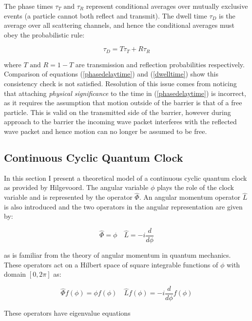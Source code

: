 \documentclass{article}
\begin{document}
\noindent The phase times $\tau_T \text{ and } \tau_R$ represent conditional averages over mutually exclusive events (a particle cannot both reflect and transmit). The dwell time $\tau_D$ is the average over all scattering channels, and hence the conditional averages must obey the probabilistic rule:

\begin{equation}
	\tau_D = T\tau_T+R\tau_R
\end{equation}

\noindent where $T \text{ and } R = 1-T$ are transmission and reflection probabilities respectively. Comparison of equations (\ref{phasedelaytime}) and (\ref{dwelltime}) show this consistency check is not satisfied. Resolution of this issue comes from noticing that attaching \textit{physical significance} to the time in (\ref{phasedelaytime}) is incorrect, as it requires the assumption that motion outside of the barrier is that of a free particle. This is valid on the transmitted side of the barrier, however during approach to the barrier the incoming wave packet interferes with the reflected wave packet and hence motion can no longer be assumed to be free.



\subsection{Continuous Cyclic Quantum Clock}

In this section I present a theoretical model of a continuous cyclic quantum clock as provided by Hilgevoord. The angular variable $\phi$ plays the role of the clock variable and is represented by the operator $\hat{\Phi}$. An angular momentum operator $\hat{L}$ is also introduced and the two operators in the angular representation are given by:

\begin{equation}
	\hat{\Phi} = \phi \quad \hat{L} = -i \frac{d}{d\phi}
\end{equation}

\noindent as is familiar from the theory of angular momentum in quantum mechanics. These operators act on a Hilbert space of square integrable functions of $\phi$ with domain $[0,2\pi]$ as:

\begin{equation}
	\hat{\Phi} f(\phi) = \phi f(\phi) \quad \hat{L} f(\phi) = -i \frac{d}{d\phi}f(\phi)
\end{equation}

These operators have eigenvalue equations 
\end{document}
